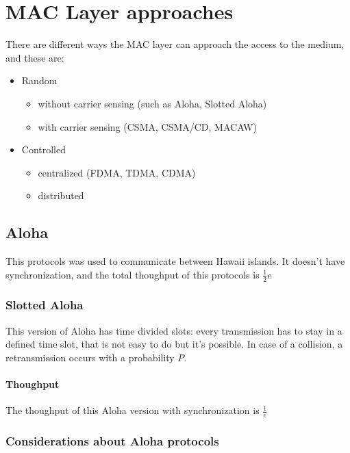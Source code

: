 \section{MAC Layer approaches}

There are different ways the MAC layer can approach the access to the medium,
and these are:
\begin{itemize}
\item Random
  \begin{itemize}
  \item without carrier sensing (such as Aloha, Slotted Aloha)
  \item with carrier sensing (CSMA, CSMA/CD, MACAW)
  \end{itemize}
\item Controlled
  \begin{itemize}
  \item centralized (FDMA, TDMA, CDMA)
  \item distributed
  \end{itemize}
\end{itemize}

\subsection{Aloha}

This protocols was used to communicate between Hawaii islands. It doesn't have
synchronization, and the total thoughput of this protocols is $\frac{1}{2}e$

\subsubsection{Slotted Aloha}

This version of Aloha has time divided slots: every transmission has to stay in
a defined time slot, that is not easy to do but it's possible. In case of a
collision, a retransmission occurs with a probability $P$.

\paragraph*{Thoughput} The thoughput of this Aloha version with synchronization
is $\frac{1}{e}$

\subsubsection{Considerations about Aloha protocols}


